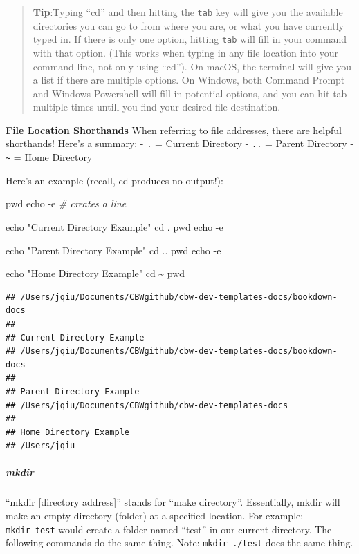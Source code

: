 \documentclass[
]{book}
\newenvironment{Shaded}{\begin{snugshade}}{\end{snugshade}}
\newcommand{\AttributeTok}[1]{\textcolor[rgb]{0.13,0.29,0.53}{#1}}
\newcommand{\BuiltInTok}[1]{#1}
\newcommand{\CommentTok}[1]{\textcolor[rgb]{0.56,0.35,0.01}{\textit{#1}}}
\newcommand{\NormalTok}[1]{#1}
\newcommand{\StringTok}[1]{\textcolor[rgb]{0.31,0.60,0.02}{#1}}
\theoremstyle{definition}
\theoremstyle{definition}
\theoremstyle{definition}
\theoremstyle{definition}
\theoremstyle{remark}
\begin{document}
\begin{quote}
\textbf{Tip}:Typing ``cd'' and then hitting the \texttt{tab} key will give you the available directories you can go to from where you are, or what you have currently typed in. If there is only one option, hitting \texttt{tab} will fill in your command with that option. (This works when typing in any file location into your command line, not only using ``cd''). On macOS, the terminal will give you a list if there are multiple options. On Windows, both Command Prompt and Windows Powershell will fill in potential options, and you can hit tab multiple times untill you find your desired file destination.
\end{quote}

\textbf{File Location Shorthands} When referring to file addresses, there are helpful shorthands! Here's a summary: - \texttt{.} = Current Directory - \texttt{..} = Parent Directory - \texttt{\textasciitilde{}} = Home Directory

Here's an example (recall, cd produces no output!):

\begin{Shaded}
\begin{Highlighting}[]
\BuiltInTok{pwd}
\BuiltInTok{echo} \AttributeTok{{-}e} \CommentTok{\# creates a line}

\BuiltInTok{echo} \StringTok{"Current Directory Example"}
\BuiltInTok{cd}\NormalTok{ .}
\BuiltInTok{pwd}
\BuiltInTok{echo} \AttributeTok{{-}e}

\BuiltInTok{echo} \StringTok{"Parent Directory Example"}
\BuiltInTok{cd}\NormalTok{ ..}
\BuiltInTok{pwd}
\BuiltInTok{echo} \AttributeTok{{-}e}

\BuiltInTok{echo} \StringTok{"Home Directory Example"}
\BuiltInTok{cd}\NormalTok{ \textasciitilde{}}
\BuiltInTok{pwd}
\end{Highlighting}
\end{Shaded}

\begin{verbatim}
## /Users/jqiu/Documents/CBWgithub/cbw-dev-templates-docs/bookdown-docs
## 
## Current Directory Example
## /Users/jqiu/Documents/CBWgithub/cbw-dev-templates-docs/bookdown-docs
## 
## Parent Directory Example
## /Users/jqiu/Documents/CBWgithub/cbw-dev-templates-docs
## 
## Home Directory Example
## /Users/jqiu
\end{verbatim}

\subparagraph*{mkdir}\label{mkdir}

``mkdir {[}directory address{]}'' stands for ``make directory''. Essentially, mkdir will make an empty directory (folder) at a specified location. For example: \texttt{mkdir\ test} would create a folder named ``test'' in our current directory. The following commands do the same thing. Note: \texttt{mkdir\ ./test} does the same thing.
\end{document}
